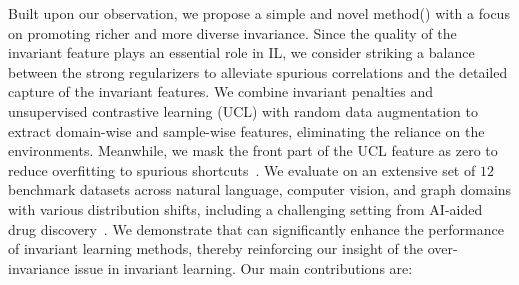 Built upon our observation, we propose a simple and novel method\oursfull (\ours) with a focus on promoting richer and more diverse invariance. 
Since the quality of the invariant feature plays an essential role in IL, we consider striking a balance between the strong regularizers to alleviate spurious correlations and the detailed capture of the invariant features.
We combine invariant penalties and unsupervised contrastive learning (UCL) with random data augmentation to extract domain-wise and sample-wise features, eliminating the reliance on the environments.
Meanwhile, we mask the front part of the UCL feature as zero to reduce overfitting to spurious shortcuts~\citep{DC_leCun}.
We evaluate \ours on an extensive set of $12$ benchmark datasets across natural language, computer vision, and graph domains with various distribution shifts, including a challenging setting from AI-aided drug discovery~\citep{drugood}. 
We demonstrate that \ours can significantly enhance the performance of invariant learning methods, thereby reinforcing our insight of the over-invariance issue in invariant learning.
Our main contributions are:
